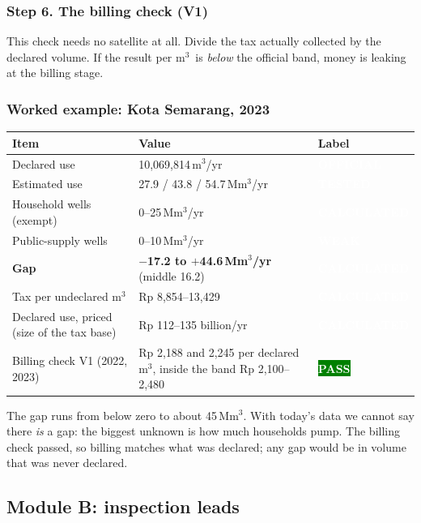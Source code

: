 \documentclass[11pt,a4paper]{article}
\newcommand{\pv}[2]{{\setlength{\fboxsep}{1.3pt}\colorbox{#1}{\textcolor{white}{\sffamily\bfseries\fontsize{6.3}{7}\selectfont #2}}}}
\newcommand{\Off}{\pv{accent}{OFFICIAL}}
\newcommand{\Tst}{\pv{tested}{TESTED}}
\newcommand{\Calc}{\pv{calc}{CALCULATED}}
\newcommand{\Wk}{\pv{weak}{WEAK}}
\newcommand{\Pass}{\pv{green}{PASS}}
\newcommand{\Mm}{\,Mm$^{3}$}
\newcommand{\Mmyr}{\,Mm$^{3}$/yr}
\newcommand{\mthree}{m$^{3}$}
\begin{document}
\subsubsection{Step 6. The billing check (V1)}
This check needs no satellite at all. Divide the tax actually collected by the declared volume. If the
result per \mthree\ is \emph{below} the official band, money is leaking at the billing stage.

\subsubsection{Worked example: Kota Semarang, 2023}

\begin{center}
\small
\begin{tabularx}{\linewidth}{@{}L{52mm}Y l@{}}
\toprule
\textbf{Item} & \textbf{Value} & \textbf{Label}\\
\midrule
Declared use & 10,069,814\,\mthree/yr & \Off\\
Estimated use & 27.9 / 43.8 / 54.7\Mmyr & \Tst\\
Household wells (exempt) & 0--25\Mmyr & \Calc\\
Public-supply wells & 0--10\Mmyr & \Wk\\
\textbf{Gap} & \textbf{$-$17.2 to $+$44.6\Mmyr} (middle 16.2) & \Calc\\
Tax per undeclared \mthree & Rp 8,854--13,429 & \Calc\\
Declared use, priced (size of the tax base) & Rp 112--135 billion/yr & \Calc\\
Billing check V1 (2022, 2023) & Rp 2,188 and 2,245 per declared \mthree, inside the band Rp 2,100--2,480
  & \Pass\\
\bottomrule
\end{tabularx}
\end{center}

\begin{caution}
The gap runs from below zero to about 45\Mm. With today's data we cannot say there \emph{is} a gap: the
biggest unknown is how much households pump. The billing check passed, so billing matches what was
declared; any gap would be in volume that was never declared.
\end{caution}

\subsection{Module B: inspection leads}
\end{document}
